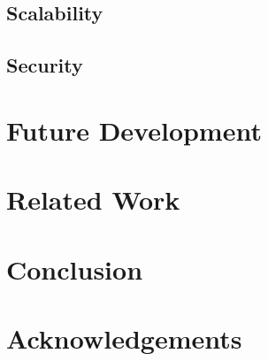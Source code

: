 \documentclass{sig-alternate}
\begin{document}
\subsection{Scalability}

\subsection{Security}

\section{Future Development}

\section{Related Work}

\section{Conclusion}

\section{Acknowledgements}
\end{document}
